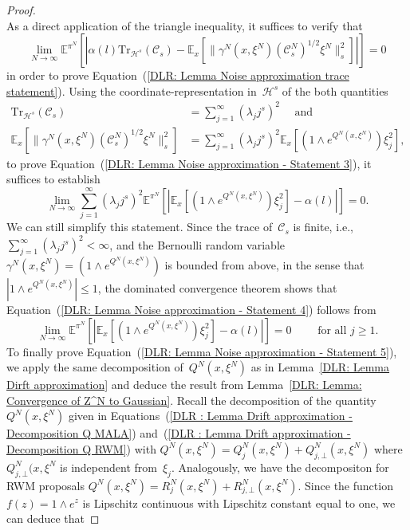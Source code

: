 \begin{proof}
\begin{equation}
  \end{equation}
  As a direct application of the triangle inequality, it suffices to verify that
  \begin{equation}
    \label{DLR: Lemma Noise approximation - Statement 3}
    \lim_{N \to \infty}  \mathbb{E}^{\pi^N}[| \alpha(l)  \text{Tr}_{\mathcal{H}^s} (\mathcal{C}_s) - \mathbb{E}_x[ \| \gamma^N(x, \xi^N) (\mathcal{C}_s^N)^{1/2} \xi^N \|_s^2] |] = 0
  \end{equation}
  in order to prove Equation~(\ref{DLR: Lemma Noise approximation trace statement}). Using the coordinate-representation in~$\mathcal{H}^s$ of the both quantities 
  \begin{align*}
    \text{Tr}_{\mathcal{H}^s} (\mathcal{C}_s) & = \sum_{j=1}^{\infty} (\lambda_j j^s)^2  \quad \text{ and }\\ 
    \mathbb{E}_x[ \| \gamma^N(x, \xi^N) (\mathcal{C}_s^N)^{1/2} \xi^N \|_s^2] & = \sum_{j=1}^{\infty} (\lambda_j j^s)^2 \mathbb{E}_x[(1 \wedge e^{Q^N(x, \xi^N)})\xi_j^2],
  \end{align*}
  to prove Equation~(\ref{DLR: Lemma Noise approximation - Statement 3}), it suffices to establish
  \begin{equation}
    \label{DLR: Lemma Noise approximation - Statement 4}
    \lim_{N \to \infty} \sum_{j=1}^{\infty} (\lambda_j j^s)^2 \mathbb{E}^{\pi^N}[|\mathbb{E}_x[(1 \wedge e^{Q^N(x, \xi^N)})\xi_j^2] - \alpha(l)|] = 0.
  \end{equation}
  We can still simplify this statement. Since the trace of~$\mathcal{C}_s$ is finite, i.e., $ \sum_{j=1}^{\infty} (\lambda_j j^s)^2 < \infty $, and the Bernoulli random variable~$\gamma^N(x, \xi^N) = (1 \wedge e^{Q^N(x, \xi^N)})$ is bounded from above, in the sense that $|1 \wedge e^{Q^N(x, \xi^N)}| \leq 1$, the dominated convergence theorem shows that Equation~(\ref{DLR: Lemma Noise approximation - Statement 4}) follows from
  \begin{equation}
   \label{DLR: Lemma Noise approximation - Statement 5}
   \lim_{N \to \infty}  \mathbb{E}^{\pi^N}[|\mathbb{E}_x[(1 \wedge e^{Q^N(x, \xi^N)})\xi_j^2] - \alpha(l)|] = 0 \qquad \text{ for all } j \geq 1.
  \end{equation}
  To finally prove Equation~(\ref{DLR: Lemma Noise approximation - Statement 5}), we apply the same decomposition of~$Q^N(x, \xi^N)$ as in Lemma~\ref{DLR: Lemma Dirft approximation} and deduce the result from Lemma~\ref{DLR: Lemma: Convergence of Z^N to Gaussian}. Recall the decomposition of the quantity~$Q^N(x, \xi^N)$ given in Equations~(\ref{DLR : Lemma Drift approximation - Decomposition Q MALA}) and~(\ref{DLR : Lemma Drift approximation - Decomposition Q RWM}) with $Q^N(x, \xi^N) = Q^N_j(x, \xi^N) + Q^N_{j, \bot}(x, \xi^N)$ where~$Q^N_{j, \bot}(x, \xi^N$ is independent from~$\xi_j$. Analogously, we have the decompositon for RWM proposals $Q^N(x, \xi^N) = R^N_j(x, \xi^N) + R^N_{j, \bot}(x, \xi^N)$. Since the function~$ f (z) =  1 \wedge e^{z}$ is Lipschitz continuous with Lipschitz constant equal to one, we can deduce that

\end{proof}
